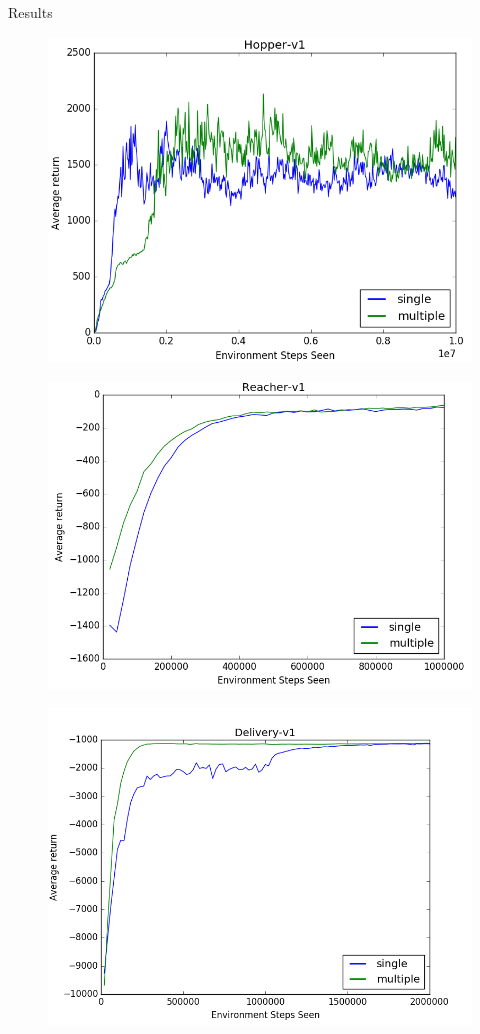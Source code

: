 \documentclass[final]{beamer}
\newlength{\onecolwid}
\newlength{\twocolwid}
\begin{document}
\begin{frame}[t]
\begin{columns}[t]
\begin{column}{\twocolwid}
\begin{columns}[t,totalwidth=\twocolwid]
\begin{column}{\onecolwid}
\begin{block}{Results}
    \begin{figure}
    \includegraphics[width=0.5\linewidth]{hopper.png}
    \end{figure}

    \begin{figure}
    \includegraphics[width=0.5\linewidth]{reacher.png}
    \end{figure}

    \begin{figure}
    \includegraphics[width=0.5\linewidth]{delivery.png}
    \end{figure}


\end{block}



\end{column} %

\end{columns} %


\end{column}
\end{columns}
\end{frame}
\end{document}
